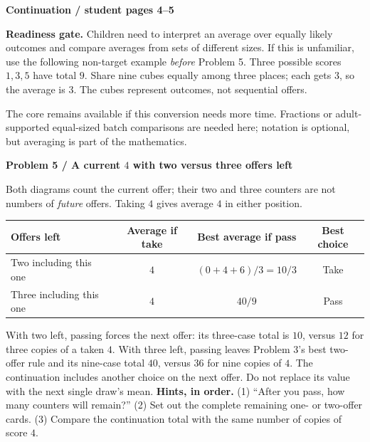 \documentclass[11pt,letterpaper]{article}
\newcommand{\topic}[1]{\par\textbf{\large #1}\par}
\newcommand{\task}[2]{\par\textbf{Problem #1 / #2}\par}
\newcommand{\hint}[1]{\textbf{Hints, in order.} #1\par}
\begin{document}
\newpage
\topic{Continuation / student pages 4--5}
\textbf{Readiness gate.} Children need to interpret an average over equally likely
outcomes and compare averages from sets of different sizes. If this is unfamiliar,
use the following non-target example \emph{before} Problem 5. Three possible scores
$1,3,5$ have total $9$. Share nine cubes equally among three places; each gets
$3$, so the average is $3$. The cubes represent outcomes, not sequential offers.
\begin{center}
\end{center}
The core remains available if this conversion needs more time. Fractions or
adult-supported equal-sized batch comparisons are needed here; notation is
optional, but averaging is part of the mathematics.

\task{5}{A current $4$ with two versus three offers left}
Both diagrams count the current offer; their two and three counters are not
numbers of \emph{future} offers. Taking $4$ gives average $4$ in either position.
\begin{center}
\begin{tabular}{@{}lccc@{}}\toprule
Offers left & Average if take & Best average if pass & Best choice \\\midrule
Two including this one & $4$ & $(0+4+6)/3=10/3$ & Take \\
Three including this one & $4$ & $40/9$ & Pass \\\bottomrule
\end{tabular}\end{center}
With two left, passing forces the next offer: its three-case total is $10$,
versus $12$ for three copies of a taken $4$. With three left, passing leaves
Problem 3's best two-offer rule and its nine-case total $40$, versus $36$ for
nine copies of $4$. The continuation includes another choice on the next offer.
Do not replace its value with the next single draw's mean.
\hint{(1) ``After you pass, how many counters will remain?''
(2) Set out the complete remaining one- or two-offer cards.
(3) Compare the continuation total with the same number of copies of score $4$.}
\end{document}
